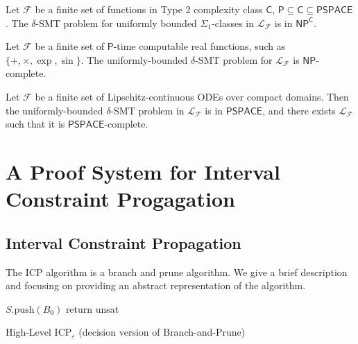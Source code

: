 \documentclass[envcountsect]{llncs}
\begin{document}
\begin{theorem}[Complexity]
Let $\mathcal{F}$ be a finite set of functions in Type 2 complexity class
$\mathsf{C}$, $\mathsf{P}\subseteq\mathsf{C}\subseteq\mathsf{PSPACE}$. The
$\delta$-SMT problem for uniformly bounded $\Sigma_1$-classes in
$\mathcal{L}_{\mathcal{F}}$ is in $\mathsf{NP^C}$. 
\end{theorem}
\begin{corollary}
Let $\mathcal{F}$ be a finite set of $\mathsf{P}$-time computable real
functions, such as $\{+, \times, \exp, \sin\}$. The uniformly-bounded
$\delta$-SMT problem for $\mathcal{L}_{\mathcal{F}}$ is $\mathsf{NP}$-complete.
\end{corollary}
\begin{corollary}
Let $\mathcal{F}$ be a finite set of Lipschitz-continuous ODEs over compact
domains. Then the uniformly-bounded $\delta$-SMT problem in
$\mathcal{L}_{\mathcal{F}}$ is in $\mathsf{PSPACE}$, and there exists
$\mathcal{L}_{\mathcal{F}}$ such that it is $\mathsf{PSPACE}$-complete.
\end{corollary}

\newpage
\section{A Proof System for Interval Constraint Progagation}

\subsection{Interval Constraint Propagation}

The ICP algorithm is a branch and prune algorithm. We give a brief description
and focusing on providing an abstract representation of the algorithm.  

\begin{algorithm}[h!]\label{algo1}
\BlankLine
$S.\mathrm{push}(B_0)$\;
\While{$S\neq \emptyset$}{\label{while}
$B\leftarrow S.\mathrm{pop}()$ \;
\While{$\exists 1\leq i \leq m, B\neq \mathrm{Prune}(B,f_i)$}{
        $B\leftarrow\mathrm{Prune}(B, f_i)$ \;
}
\If{$B\neq \emptyset$}
{\eIf{$\exists 1\leq i\leq n, |I_i|\geq \varepsilon$}{$\{B_1,B_2\}\leftarrow
\mathrm{Branch}(B, i)$\;$S.\mathrm{push}(\{B_1,B_2\})$\;}{return {\sf sat}\;}}
}
return {\sf unsat}\;
\caption{High-Level ICP$_{\varepsilon}$ (decision version of Branch-and-Prune)}
\end{algorithm}
\end{document}
